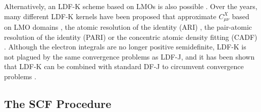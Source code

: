 \noindent Alternatively, an LDF-K scheme based on LMOs is also possible \cite{Pol2004,Mej2014}. Over the years, many different LDF-K kernels have been proposed that approximate $C_{\mu\nu}^X$ based on LMO domains \cite{Pol2004,Mej2014}, the atomic resolution of the identity (ARI) \cite{Sod2008}, the pair-atomic resolution of the identity (PARI) \cite{Mer2013} or the concentric atomic density fitting (CADF) \cite{Hol2017}. Although the electron integrals are no longer positive semidefinite, LDF-K is not plagued by the same convergence problems as LDF-J, and it has been shown that LDF-K can be combined with standard DF-J to circumvent convergence problems \cite{Man2015}. 


%


\subsection{The SCF Procedure}

